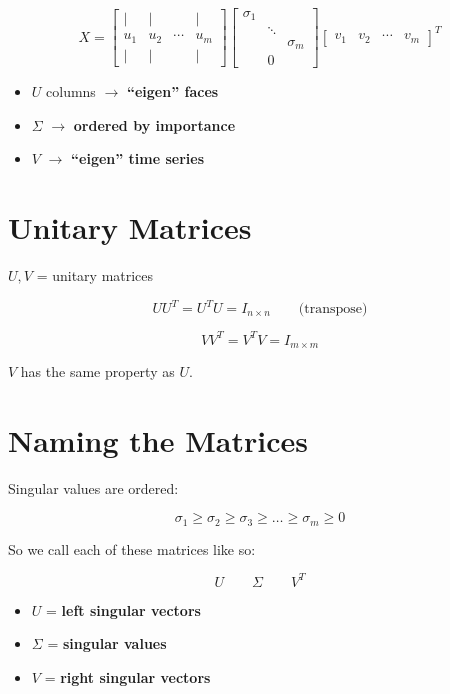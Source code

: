 \documentclass[11pt,a4paper]{article}
\begin{document}
\[
  X =
  \begin{bmatrix} | & | & & | \\ u_1 & u_2 & \cdots & u_m \\ | & | & & | \end{bmatrix}
  \begin{bmatrix} \sigma_1 & & \\ & \ddots & \\ & & \sigma_m \\ & 0 & \end{bmatrix}
  \begin{bmatrix} v_1 & v_2 & \cdots & v_m \end{bmatrix}^T
\]

\begin{itemize}
  \item $U$ columns $\rightarrow$ \textbf{``eigen'' faces}
  \item $\Sigma$ $\rightarrow$ \textbf{ordered by importance}
  \item $V$ $\rightarrow$ \textbf{``eigen'' time series}
\end{itemize}

\section{Unitary Matrices}

$U, V$ = unitary matrices

\[
  UU^T = U^TU = I_{n \times n} \qquad \text{(transpose)}
\]

\[
  VV^T = V^TV = I_{m \times m}
\]

\begin{callout}
$V$ has the same property as $U$.
\end{callout}

\section{Naming the Matrices}

Singular values are ordered:

\[
  \sigma_1 \geq \sigma_2 \geq \sigma_3 \geq \dots \geq \sigma_m \geq 0
\]

So we call each of these matrices like so:

\[
  U \qquad \Sigma \qquad V^T
\]

\begin{itemize}
  \item $U$ = \textbf{left singular vectors}
  \item $\Sigma$ = \textbf{singular values}
  \item $V$ = \textbf{right singular vectors}
\end{itemize}
\end{document}
